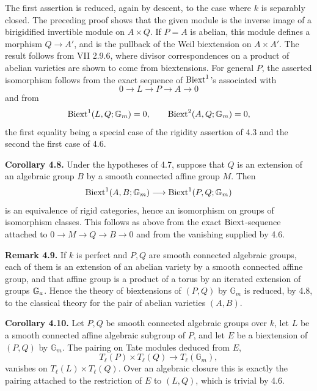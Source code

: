 \documentclass[11pt]{article}
\providecommand{\Gm}{\mathbb G_m}
\begin{document}
The first assertion is reduced, again by descent, to the case where \(k\) is separably closed.  The preceding proof shows that the given module is the inverse image of a birigidified invertible module on \(A\times Q\).  If \(P=A\) is abelian, this module defines a morphism \(Q\to A'\), and is the pullback of the Weil biextension on \(A\times A'\).  The result follows from VII 2.9.6, where divisor correspondences on a product of abelian varieties are shown to come from biextensions.  For general \(P\), the asserted isomorphism follows from the exact sequence of \(\operatorname{Biext}^1\)'s associated with
\[
  0\longrightarrow L\longrightarrow P\longrightarrow A\longrightarrow 0
\]
and from
\[
  \Biext^1(L,Q;\Gm)=0,
  \qquad
  \Biext^2(A,Q;\Gm)=0,
\]
the first equality being a special case of the rigidity assertion of 4.3 and the second the first case of 4.6.

\textbf{Corollary 4.8.}  Under the hypotheses of 4.7, suppose that \(Q\) is an extension of an algebraic group \(B\) by a smooth connected affine group \(M\).  Then
\[
  \Biext^1(A,B;\Gm)\longrightarrow \Biext^1(P,Q;\Gm)
\]
is an equivalence of rigid categories, hence an isomorphism on groups of isomorphism classes.  This follows as above from the exact \(\operatorname{Biext}\)-sequence attached to \(0\to M\to Q\to B\to 0\) and from the vanishing supplied by 4.6.

\textbf{Remark 4.9.}  If \(k\) is perfect and \(P,Q\) are smooth connected algebraic groups, each of them is an extension of an abelian variety by a smooth connected affine group, and that affine group is a product of a torus by an iterated extension of groups \(\mathbb G_a\).  Hence the theory of biextensions of \((P,Q)\) by \(\Gm\) is reduced, by 4.8, to the classical theory for the pair of abelian varieties \((A,B)\).

\textbf{Corollary 4.10.}  Let \(P,Q\) be smooth connected algebraic groups over \(k\), let \(L\) be a smooth connected affine algebraic subgroup of \(P\), and let \(E\) be a biextension of \((P,Q)\) by \(\Gm\).  The pairing on Tate modules deduced from \(E\),
\[
  T_\ell(P)\times T_\ell(Q)\longrightarrow T_\ell(\Gm),
\]
vanishes on \(T_\ell(L)\times T_\ell(Q)\).  Over an algebraic closure this is exactly the pairing attached to the restriction of \(E\) to \((L,Q)\), which is trivial by 4.6.
\end{document}
